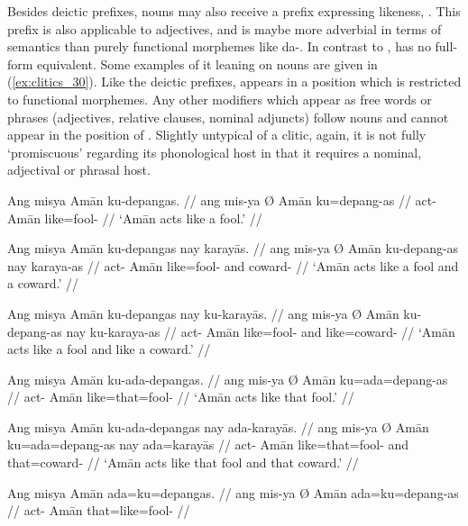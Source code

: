 \label{clitics_prenoun_ku}
Besides deictic prefixes, nouns may also receive a prefix expressing likeness,
. This prefix is also applicable to adjectives, and is maybe
more adverbial in terms of semantics than purely functional morphemes like
 {da-}. In contrast to ,  has no 
full-form equivalent. Some examples of it leaning on nouns are given in
(\ref{ex:clitics_30}). Like the deictic prefixes,  appears in a
position which is restricted to functional morphemes. Any other modifiers
which appear as free words or phrases (adjectives, relative clauses, nominal
adjuncts) follow nouns and cannot appear in the position of .
Slightly untypical of a clitic, again, it is not fully `promiscuous' regarding
its  phonological host in that it requires a nominal, adjectival or phrasal
host.

\pex\label{ex:clitics_30}
\a\label{ex:clitics_30a}\begingl
	\gla Ang misya {} Amān ku-depangas. //
	\glb ang mis-ya Ø Amān ku=depang-as //
	\glc \AgtT{} act-\TsgM{} \Top{} Amān like=fool-\Parg{} //
	\glft `Amān acts like a fool.' //
\endgl

\a\label{ex:clitics_30b}\begingl
	\gla Ang misya {} Amān ku-depangas nay karayās. //
	\glb ang mis-ya Ø Amān ku-depang-as nay karaya-as //
	\glc \AgtT{} act-\TsgM{} \Top{} Amān like=fool-\Parg{} and 
		coward-\Parg{} //
	\glft `Amān acts like a fool and a coward.' //
\endgl

\a\label{ex:clitics_30c}\begingl
	\gla Ang misya {} Amān ku-depangas nay ku-karayās. //
	\glb ang mis-ya Ø Amān ku-depang-as nay ku-karaya-as //
	\glc \AgtT{} act-\TsgM{} \Top{} Amān like=fool-\Parg{} and 
		like=coward-\Parg{}	//
	\glft `Amān acts like a fool and like a coward.' //
\endgl

\a\label{ex:clitics_30d}\begingl
	\gla Ang misya {} Amān ku-ada-depangas. //
	\glb ang mis-ya Ø Amān ku=ada=depang-as //
	\glc \AgtT{} act-\TsgM{} \Top{} Amān like=that=fool-\Parg{} //
	\glft `Amān acts like that fool.' //
\endgl

\a\label{ex:clitics_30e}\begingl
	\gla Ang misya {} Amān ku-ada-depangas nay ada-karayās. //
	\glb ang mis-ya Ø Amān ku=ada=depang-as nay ada=karayās //
	\glc \AgtT{} act-\TsgM{} \Top{} Amān like=that=fool-\Parg{} and 
		that=coward-\Parg{} //
	\glft `Amān acts like that fool and that coward.' //
\endgl

\a\label{ex:clitics_30f}\ljudge{*}\begingl
	\gla Ang misya {} Amān ada=ku=depangas. //
	\glb ang mis-ya Ø Amān ada=ku=depang-as //
	\glc \AgtT{} act-\TsgM{} \Top{} Amān that=like=fool-\Parg{} //
\endgl
\xe


